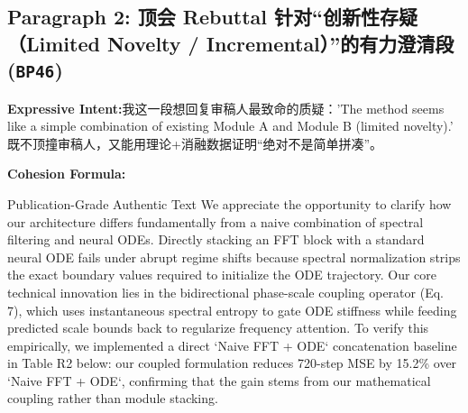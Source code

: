 \subsection*{Paragraph 2: 顶会 Rebuttal 针对“创新性存疑（Limited Novelty / Incremental）”的有力澄清段 (\texttt{BP46})}
\noindent\textbf{Expressive Intent:}\enspace 我这一段想回复审稿人最致命的质疑：'The method seems like a simple combination of existing Module A and Module B (limited novelty).' 既不顶撞审稿人，又能用理论+消融数据证明“绝对不是简单拼凑”。\par
\noindent\textbf{Cohesion Formula:}\par\vspace{4pt}
\begin{ExampleBox}{Publication-Grade Authentic Text}
We appreciate the opportunity to clarify how our architecture differs fundamentally from a naive combination of spectral filtering and neural ODEs. Directly stacking an FFT block with a standard neural ODE fails under abrupt regime shifts because spectral normalization strips the exact boundary values required to initialize the ODE trajectory. Our core technical innovation lies in the bidirectional phase-scale coupling operator (Eq. 7), which uses instantaneous spectral entropy to gate ODE stiffness while feeding predicted scale bounds back to regularize frequency attention. To verify this empirically, we implemented a direct `Naive FFT + ODE` concatenation baseline in Table R2 below: our coupled formulation reduces 720-step MSE by 15.2\% over `Naive FFT + ODE`, confirming that the gain stems from our mathematical coupling rather than module stacking.
\end{ExampleBox}
